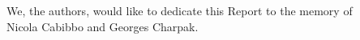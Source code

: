 \begin{center}
We, the authors, would like to dedicate this Report to the memory of \\
Nicola Cabibbo and Georges Charpak.
\end{center}
